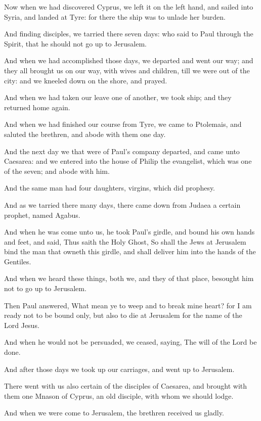 \Verse Now when we had discovered Cyprus, we left it on the left hand, and sailed into Syria, and landed at Tyre: for there the ship was to unlade her burden.

\Verse And finding disciples, we tarried there seven days: who said to Paul through the Spirit, that he should not go up to Jerusalem.

\Verse And when we had accomplished those days, we departed and went our way; and they all brought us on our way, with wives and children, till we were out of the city: and we kneeled down on the shore, and prayed.

\Verse And when we had taken our leave one of another, we took ship; and they returned home again.

\Verse And when we had finished our course from Tyre, we came to Ptolemais, and saluted the brethren, and abode with them one day.

\Verse And the next day we that were of Paul's company departed, and came unto Caesarea: and we entered into the house of Philip the evangelist, which was one of the seven; and abode with him.

\Verse And the same man had four daughters, virgins, which did prophesy.

\Verse And as we tarried there many days, there came down from Judaea a certain prophet, named Agabus.

\Verse And when he was come unto us, he took Paul's girdle, and bound his own hands and feet, and said, Thus saith the Holy Ghost, So shall the Jews at Jerusalem bind the man that owneth this girdle, and shall deliver him into the hands of the Gentiles.

\Verse And when we heard these things, both we, and they of that place, besought him not to go up to Jerusalem.

\Verse Then Paul answered, What mean ye to weep and to break mine heart?  for I am ready not to be bound only, but also to die at Jerusalem for the name of the Lord Jesus.

\Verse And when he would not be persuaded, we ceased, saying, The will of the Lord be done.

\Verse And after those days we took up our carriages, and went up to Jerusalem.

\Verse There went with us also certain of the disciples of Caesarea, and brought with them one Mnason of Cyprus, an old disciple, with whom we should lodge.

\Verse And when we were come to Jerusalem, the brethren received us gladly.

